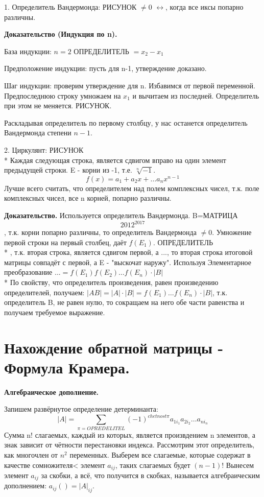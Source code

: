 \documentclass{article}
\begin{document}
1. Определитель Вандермонда: РИСУНОК $\ne0$ $\leftrightarrow$, когда  все иксы попарно различны.

{\bf Доказательство (Индукция по n).}

База индукции: $n=2$ ОПРЕДЕЛИТЕЛЬ $=x_2-x_1$

Предположение индукции: пусть для n-1, утверждение доказано.

Шаг индукции: проверим утверждение для n. Избавимся от первой переменной. Предпоследнюю строку умножаем на $x_1$ и вычитаем из последней. Определитель при этом не меняется. РИСУНОК.

Раскладывая определитель по первому столбцу, у нас останется определитель Вандермонда степени $n-1$.

2. Циркулянт: РИСУНОК\\*
Каждая следующая строка, является сдвигом вправо на один элемент предыдущей строки.
E - корни из -1, т.е. $\sqrt[n]{-1}$. 
$$f(x)=a_1+a_2x+\ldots a_n x^{n-1}$$
Лучше всего считать, что определителем над полем комплексных чисел, т.к. поле комплексных чисел, все n корней, попарно различны.

{\bf Доказательство.} Используется определитель Вандермонда. B=МАТРИЦА $$2012^{2017}$$
, т.к. корни попарно различны, то определитель Вандермонда $\ne0$. Умножение первой строки на первый столбец, даёт $f(E_1)$. ОПРЕДЕЛИТЕЛЬ\\*
, т.к. вторая строка, является сдвигом первой, а ..., то вторая строка итоговой матрицы совпадёт с первой, а E - "выскочат наружу". Используя Элементарное преобразование ...$=f(E_1)f(E_2)\ldots f(E_n)\cdot|B|$\\*
По свойству, что определитель произведения, равен произведению определителей, получаем: $|AB|=|A|\cdot|B|=f(E_1)\ldots f(E_n)\cdot|B|$, т.к. определитель B, не равен нулю, то сокращаем на него обе части равенства и получаем требуемое выражение.
\section*{Нахождение обратной матрицы - Формула Крамера.}
{\bf Алгебраическое дополнение.}

Запишем развёрнутое определение детерминанта: $$|A|=\sum_{\pi=OPREDELITEL} (-1)^{chetnost\pi}a_{1i_1}a_{2i_2}\ldots a_{ni_n}$$
Сумма n! слагаемых, каждый из которых, является произвдением n элементов, а знак зависит от чётности перестановки индекса. Рассмотрим этот определитель, как многочлен от $n^2$ переменных. Выберем все слагаемые, которые содержат в качестве сомножителя< элемент $a_{ij}$, таких слагаемых будет $(n-1)!$ Вынесем элемент $a_{ij}$ за скобки, а всё, что получится в скобках, называется алгебраическим дополнением: $a_{ij}()=|A|_{ij}$.
\end{document}
